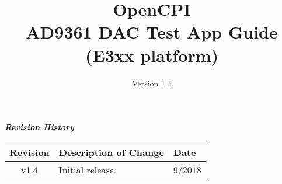 \iffalse
This file is protected by Copyright. Please refer to the COPYRIGHT file
distributed with this source distribution.

This file is part of OpenCPI <http://www.opencpi.org>

OpenCPI is free software: you can redistribute it and/or modify it under the
terms of the GNU Lesser General Public License as published by the Free Software
Foundation, either version 3 of the License, or (at your option) any later
version.

OpenCPI is distributed in the hope that it will be useful, but WITHOUT ANY
WARRANTY; without even the implied warranty of MERCHANTABILITY or FITNESS FOR A
PARTICULAR PURPOSE. See the GNU Lesser General Public License for more details.

You should have received a copy of the GNU Lesser General Public License along
with this program. If not, see <http://www.gnu.org/licenses/>.
\fi

\def\docTitle{OpenCPI\\ AD9361 DAC Test App Guide (E3xx platform)}
\def\docVersion{1.4}

\date{Version \docVersion} %
\title{\docTitle}
\usepackage{graphicx}
\graphicspath{ {figures/} }
\usepackage{textcomp}
\usepackage{listings}


\maketitle
	\begin{center}
	\textit{\textbf{Revision History}}
		\begin{table}[H]
		\label{table:revisions} %
			\begin{tabularx}{\textwidth}{|c|X|l|}
			\hline
			\rowcolor{blue}
			\textbf{Revision} & \textbf{Description of Change} & \textbf{Date} \\
		    \hline
		    v1.4 & Initial release. & 9/2018 \\
			\hline
			\end{tabularx}
		\end{table}
	\end{center}

